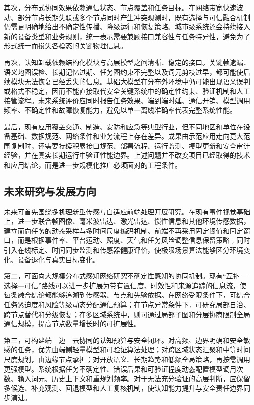 其次，分布式协同效果依赖通信状态、节点覆盖和任务目标。在网络带宽快速波动、部分节点长期失联或多个节点同时产生冲突观测时，既有选择与可信融合机制仍需更明确地给出不确定性传播、降级运行和恢复策略。城市级系统还会持续接入新的设备类型和业务规则，统一表示需要兼顾接口兼容性与任务特异性，避免为了形式统一而损失各模态的关键物理信息。

再次，认知卸载依赖结构化模块与高层模型之间清晰、稳定的接口。关键帧遗漏、语义地图误检、长期记忆过期、任务图约束不完整以及词元剪枝过早，都可能使后续模块无法恢复已经丢失的信息。基础大模型在分布外环境中仍可能出现语义误判或格式不稳定，因而不能直接取代安全关键系统中的确定性约束、验证机制和人工接管流程。未来系统评价应同时报告任务效果、端到端时延、通信开销、模型调用频率、不确定性和故障恢复能力，避免以单一离线准确率代表完整系统性能。

最后，现有应用覆盖交通、制造、安防和应急等典型行业，但不同地区和单位在设备基础、数据规范、网络条件和业务流程上存在差异。成果由示范应用走向更大范围复制时，还需要持续积累接口规范、部署流程、运行监测、模型更新和安全审计经验，并在真实长期运行中验证性能边界。上述问题并不改变项目已经取得的技术和应用结论，而是进一步规模化推广必须面对的工程条件。

\subsection{未来研究与发展方向}

未来可首先围绕多机理新型传感与自适应前端处理开展研究。在现有事件视觉基础上，进一步联合帧图像、毫米波雷达、激光雷达、惯性信息和其他环境传感数据，建立面向任务的动态采样与多时间尺度编码机制。前端不再采用固定阈值和固定窗口，而是根据事件率、平台运动、照度、天气和任务风险调整信息保留策略；同时引入在线标定、时间同步监测和传感器健康评价，使极限场景算法能够区分环境变化、设备退化与真实目标变化。

第二，可面向大规模分布式感知网络研究不确定性感知的协同机制。现有“互补---选择---可信”路线可以进一步扩展为带有置信度、时效性和来源追踪的信息流，使每条融合结论都能够追溯到传感器、节点和先验依据。在网络受限条件下，可结合任务紧迫度和风险等级动态分配通信预算；在节点异常条件下，可研究局部自治、跨节点替代和分级恢复；在多区域系统中，则可通过局部子图和分层协商限制全局通信规模，提高节点数量增长时的可扩展性。

第三，可构建端---边---云协同的认知预算与安全闭环。对高频、边界明确和安全敏感的任务，优先由端侧轻量模型和可验证算法处理；对跨区域状态汇聚和中等时间尺度规划，由边缘节点承担；对开放语义、长期趋势和低频全局策略，再按需调用更强模型。系统根据任务不确定性、错误后果和可验证程度动态配置模型调用次数、输入词元、历史上下文和重规划频率。对于无法充分验证的高层判断，应保留多候选、补充观测、回退模型和人工复核机制，使认知能力提升与安全责任边界同步演进。

